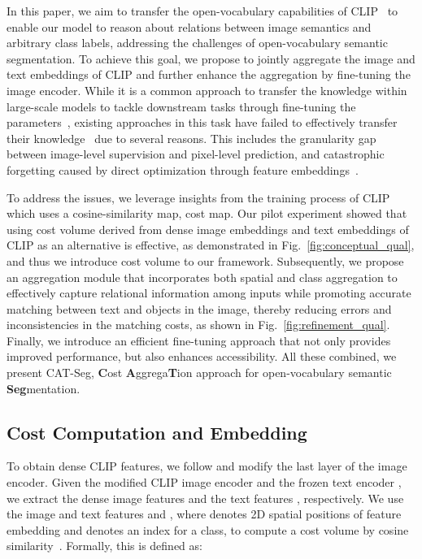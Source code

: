 \documentclass[10pt,twocolumn,letterpaper]{article}
\newcommand{\ours}{CAT-Seg\xspace}
\begin{document}
In this paper, we aim to transfer the open-vocabulary capabilities of CLIP~\cite{radford2021learning} to enable our model to reason about relations between image semantics and arbitrary class labels, addressing the challenges of open-vocabulary semantic segmentation. To achieve this goal, we propose to jointly aggregate the image and text embeddings of CLIP and further enhance the aggregation by fine-tuning the image encoder. While it is a common approach to transfer the knowledge within large-scale models to tackle downstream tasks through fine-tuning the parameters~\cite{he2017mask,mensink2021factors}, existing approaches in this task have failed to effectively transfer their knowledge~\cite{zhou2022extract} due to several reasons. This includes the granularity gap between image-level supervision and pixel-level prediction, and catastrophic forgetting caused by direct optimization through feature embeddings~\cite{zhou2022extract}.

To address the issues, we leverage insights from the training process of CLIP~\cite{radford2021learning} which uses a cosine-similarity map, \ie cost map.
Our pilot experiment showed that using cost volume derived from dense image embeddings and text embeddings of CLIP as an alternative is effective, as demonstrated in Fig.~\ref{fig:conceptual_qual}, and thus  we introduce cost volume to our framework.
Subsequently, we propose an aggregation module that incorporates both spatial and class aggregation to effectively capture relational information among inputs while promoting accurate matching between text and objects in the image, thereby reducing errors and inconsistencies in the matching costs, as shown in Fig.~\ref{fig:refinement_qual}. Finally, we introduce an efficient fine-tuning approach that not only provides improved performance, but also enhances accessibility. All these combined, we present \ours, \textbf{C}ost \textbf{A}ggrega\textbf{T}ion approach for open-vocabulary semantic \textbf{Seg}mentation.

\subsection{Cost Computation and Embedding}
To obtain dense CLIP features, we follow \cite{zhou2022extract} and modify the last layer of the image encoder.
Given the modified CLIP image encoder  and the frozen text encoder , we extract the dense image features  and the text features , respectively. We use the image and text features  and , where  denotes 2D spatial positions of feature embedding and  denotes an index for a class, to compute a cost volume  by cosine similarity~\cite{rocco2017convolutional}. 
Formally, this is defined as:
\end{document}
